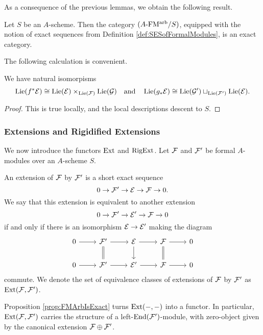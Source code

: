 \documentclass[../main.tex]{subfiles}
\begin{document}
As a consequence of the previous lemmas, we obtain the following result.
\begin{prop}\label{prop:FMArbIsExact}
  Let $S$ be an $A$-scheme. Then
  the category ${({A}\textnormal-\allowbreak\mathrm{FM^{arb}}/{S})}$, equipped with the notion of exact sequences
  from Definition \ref{def:SESofFormalModules}, is an exact category. 
\end{prop}

The following calculation is convenient.
\begin{lem}%
  We have natural isomorpisms 
  \begin{equation*}
    \operatorname{Lie}(f^* \mathcal{E}) \cong \operatorname{Lie}(\mathcal{E}) \times_{\operatorname{Lie}(\mathcal{F})} \operatorname{Lie}(\mathcal{G}) \quad \text{and}
    \quad \operatorname{Lie}(g_* \mathcal{E}) \cong \operatorname{Lie}(\mathcal{G}') \sqcup_{\operatorname{Lie}(\mathcal{F}')} \operatorname{Lie}(\mathcal{E}).
  \end{equation*}
\begin{proof}
  This is true locally, and the local descriptions descent to $S$.
\end{proof}
\end{lem}


\subsubsection{Extensions and Rigidified Extensions} %
\label{ssub:Extensions and Rigidified Extensions}
We now introduce the functors $\operatorname{Ext}$ and $\operatorname {RigExt}$. 
Let $\mathcal{F}$ and $\mathcal{F}'$ be formal $A$-modules over an $A$-scheme $S$.
\begin{defi}[Extension]
  An extension of $\mathcal{F}$ by $\mathcal{F}'$ is a short exact sequence 
  \begin{equation*}
    0 \to \mathcal{F}' \to \mathcal{E} \to \mathcal{F} \to 0.
  \end{equation*}
  We say that this extension is equivalent to another extension 
  \begin{equation*}
    0 \to \mathcal{F}' \to \mathcal{E}' \to \mathcal{F} \to 0
  \end{equation*}
  if and only if there is an isomorphism $\mathcal{E} \to \mathcal{E}'$ making the diagram 
  \begin{equation*}
    \begin{tikzcd}[ampersand replacement=\&]
    	0 \& {\cF'} \& \cE \& \cF \& 0 \\
    	0 \& {\cF'} \& {\cE'} \& \cF \& 0
    	\arrow[from=1-1, to=1-2]
    	\arrow[from=1-2, to=1-3]
    	\arrow[Rightarrow, no head, from=1-2, to=2-2]
    	\arrow[from=1-3, to=1-4]
    	\arrow[from=1-3, to=2-3]
    	\arrow[from=1-4, to=1-5]
    	\arrow[Rightarrow, no head, from=1-4, to=2-4]
    	\arrow[from=2-1, to=2-2]
    	\arrow[from=2-2, to=2-3]
    	\arrow[from=2-3, to=2-4]
    	\arrow[from=2-4, to=2-5]
    \end{tikzcd}
  \end{equation*}
  commute. We denote the set of equivalence classes of extensions of $\mathcal{F}$ by
  $\mathcal{F}'$ as $\operatorname{Ext}(\mathcal{F}, \mathcal{F}')$. 
\end{defi}
Proposition \ref{prop:FMArbIsExact} turns $\operatorname{Ext}(-,-)$ into a functor.
In particular, $\operatorname{Ext}(\mathcal{F},\mathcal{F}')$ carries the structure of a
left-$\operatorname{End}(\mathcal{F}')$-module,
with zero-object given by the canonical extension $\mathcal{F} \oplus \mathcal{F}'$.
\end{document}
